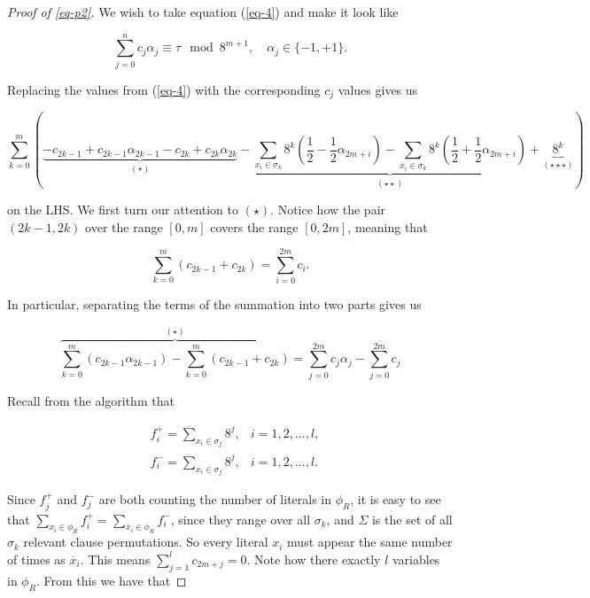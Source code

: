 \documentclass{amsart}
\newcommand{\ov}{\overline}
\theoremstyle{plain}
\begin{document}
\begin{proof}[Proof of \autoref{eq-p2}]
We wish to take equation (\ref{eq-4}) and make it look like

\begin{equation*}
  \sum_{j=0}^n c_j\alpha_j\equiv\tau\mod 8^{m+1}, \quad\alpha_j\in\{-1,+1\}.
\end{equation*}

Replacing the values from (\ref{eq-4}) with the corresponding $c_j$ values gives us

\begin{equation}\label{eq-5}
  \sum_{k=0}^m\left(\underbrace{-c_{2k-1}+c_{2k-1}\alpha_{2k-1}-c_{2k}+c_{2k}\alpha_{2k}}_{(\star)}
  -\underbrace{\sum_{x_i\in\sigma_k}8^k\left(\frac{1}{2}-\frac{1}{2}\alpha_{2m+i}\right)-\sum_{
  \ov{x}_i\in\sigma_k}8^k\left(\frac{1}{2}+\frac{1}{2}\alpha_{2m+i}\right)}_{(\star\star)}+
  \underbrace{8^k}_{(\star\star\star)}\right)
\end{equation}

on the LHS\@. We first turn our attention to $(\star)$. Notice how the pair $(2k-1,2k)$ over the
range $[0,m]$ covers the range $[0,2m]$, meaning that

\begin{equation*}
  \sum_{k=0}^m \left(c_{2k-1}+c_{2k}\right) = \sum_{i=0}^{2m} c_{i}.
\end{equation*}

In particular, separating the terms of the summation into two parts gives us

\begin{equation*}
  \overbrace{\sum_{k=0}^m\left(c_{2k-1}\alpha_{2k-1}\right)-\sum_{k=0}^m\left(c_{2k-1}+c_{2k}
  \right)}^{(\star)} = \sum_{j=0}^{2m}c_j\alpha_j-\sum_{j=0}^{2m}c_j
\end{equation*}

Recall from the algorithm that

\begin{align*}
  &f_i^+ = \sum_{x_i\in\sigma_j}8^j, &i=1,2,\ldots,l,\\
  &f_i^- = \sum_{\ov{x}_i\in\sigma_j}8^j, &i=1,2,\ldots,l.
\end{align*}

Since $f_j^+$ and $f_j^-$ are both counting the number of literals in $\phi_R$, it is easy to see
that $\sum_{x_i\in\phi_R}f_i^+=\sum_{\ov{x}_i\in\phi_R}f_i^-$, since they range over all
$\sigma_k$, and $\Sigma$ is the set of all $\sigma_k$ relevant clause permutations. So every
literal $x_i$ must appear the same number of times as $\ov{x}_i$. This means $\sum_{j=1}^l c_{2m+j}
= 0$. Note how there exactly $l$ variables in $\phi_R$. From this we have that


\end{proof}
\end{document}
